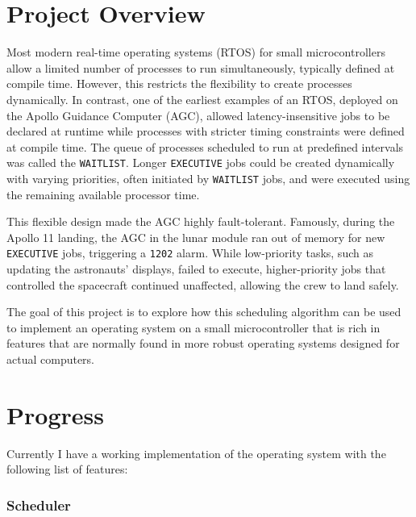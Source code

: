 \documentclass[oxford]{ahsan}
\title{\vspace{-3em}{Part C Project Progress Report}\vspace{-1em}}
\begin{document}
\maketitle
\vspace{-3em}
\section*{Project Overview}

Most modern real-time operating systems (RTOS) for small microcontrollers allow a
limited number of processes to run simultaneously, typically defined at compile time.
However, this restricts the flexibility to create processes dynamically. In contrast,
one of the earliest examples of an RTOS, deployed on the Apollo Guidance Computer
(AGC), allowed latency-insensitive jobs to be declared at runtime while processes with
stricter timing constraints were defined at compile time. The queue of processes
scheduled to run at predefined intervals was called the \texttt{WAITLIST}. Longer
\texttt{EXECUTIVE} jobs could be created dynamically with varying priorities, often
initiated by \texttt{WAITLIST} jobs, and were executed using the remaining available
processor time.

This flexible design made the AGC highly fault-tolerant. Famously, during the Apollo 11
landing, the AGC in the lunar module ran out of memory for new \texttt{EXECUTIVE} jobs,
triggering a \texttt{1202} alarm. While low-priority tasks, such as updating the
astronauts' displays, failed to execute, higher-priority jobs that controlled the
spacecraft continued unaffected, allowing the crew to land safely.

The goal of this project is to explore how this scheduling algorithm can be used to
implement an operating system on a small microcontroller that is rich in features that
are normally found in more robust operating systems designed for actual computers.

\section*{Progress}

Currently I have a working implementation of the operating system with the following
list of features:

\subsubsection*{Scheduler}
\end{document}
